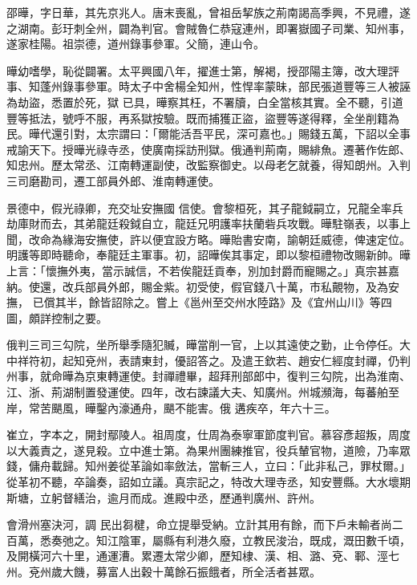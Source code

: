 \begin{pinyinscope}
 邵曄，字日華，其先京兆人。唐末喪亂，曾祖岳挈族之荊南謁高季興，不見禮，遂之湖南。彭玗刺全州，闢為判官。會賊魯仁恭寇連州，即署嶽國子司業、知州事，遂家桂陽。祖崇德，道州錄事參軍。父簡，連山令。



 曄幼嗜學，恥從闢署。太平興國八年，擢進士第，解褐，授邵陽主簿，改大理評事、知蓬州錄事參軍。時太子中舍楊全知州，性悍率蒙昧，部民張道豐等三人被誣為劫盜，悉置於死，獄
 已具，曄察其枉，不署牘，白全當核其實。全不聽，引道豐等抵法，號呼不服，再系獄按驗。既而捕獲正盜，盜豐等遂得釋，全坐削籍為民。曄代還引對，太宗謂曰：「爾能活吾平民，深可嘉也。」賜錢五萬，下詔以全事戒諭天下。授曄光祿寺丞，使廣南採訪刑獄。俄通判荊南，賜緋魚。遷著作佐郎、知忠州。歷太常丞、江南轉運副使，改監察御史。以母老乞就養，得知朗州。入判三司磨勘司，遷工部員外郎、淮南轉運使。



 景德中，假光祿卿，充交址安撫國
 信使。會黎桓死，其子龍鉞嗣立，兄龍全率兵劫庫財而去，其弟龍廷殺鉞自立，龍廷兄明護率扶蘭砦兵攻戰。曄駐嶺表，以事上聞，改命為緣海安撫使，許以便宜設方略。曄貽書安南，諭朝廷威德，俾速定位。明護等即時聽命，奉龍廷主軍事。初，詔曄俟其事定，即以黎桓禮物改賜新帥。曄上言：「懷撫外夷，當示誠信，不若俟龍廷貢奉，別加封爵而寵賜之。」真宗甚嘉納。使還，改兵部員外郎，賜金紫。初受使，假官錢八十萬，市私覿物，及為安撫，
 已償其半，餘皆詔除之。嘗上《邕州至交州水陸路》及《宜州山川》等四圖，頗詳控制之要。



 俄判三司三勾院，坐所舉季隨犯贓，曄當削一官，上以其遠使之勤，止令停任。大中祥符初，起知兗州，表請東封，優詔答之。及遣王欽若、趙安仁經度封禪，仍判州事，就命曄為京東轉運使。封禪禮畢，超拜刑部郎中，復判三勾院，出為淮南、江、浙、荊湖制置發運使。四年，改右諫議大夫、知廣州。州城瀕海，每蕃舶至岸，常苦颶風，曄鑿內濠通舟，颶不能害。俄
 遘疾卒，年六十三。



 崔立，字本之，開封鄢陵人。祖周度，仕周為泰寧軍節度判官。慕容彥超叛，周度以大義責之，遂見殺。立中進士第。為果州團練推官，役兵輦官物，道險，乃率眾錢，傭舟載歸。知州姜從革論如率斂法，當斬三人，立曰：「此非私己，罪杖爾。」從革初不聽，卒論奏，詔如立議。真宗記之，特改大理寺丞，知安豐縣。大水壞期斯塘，立躬督繕治，逾月而成。進殿中丞，歷通判廣州、許州。



 會滑州塞決河，調
 民出芻楗，命立提舉受納。立計其用有餘，而下戶未輸者尚二百萬，悉奏弛之。知江陰軍，屬縣有利港久廢，立教民浚治，既成，溉田數千頃，及開橫河六十里，通運漕。累遷太常少卿，歷知棣、漢、相、潞、兗、鄆、涇七州。兗州歲大饑，募富人出穀十萬餘石振餓者，所全活者甚眾。




\end{pinyinscope}
